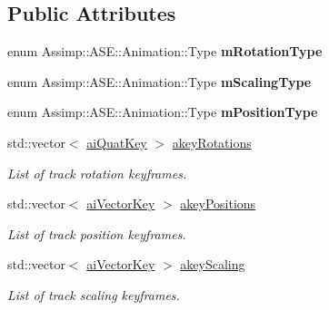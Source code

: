 \subsection*{Public Attributes}
\begin{DoxyCompactItemize}
\item 
\hypertarget{struct_assimp_1_1_a_s_e_1_1_animation_a14e7fec0c226ead3f354beba67edb8bd}{enum Assimp\+::\+A\+S\+E\+::\+Animation\+::\+Type {\bfseries m\+Rotation\+Type}}\label{struct_assimp_1_1_a_s_e_1_1_animation_a14e7fec0c226ead3f354beba67edb8bd}

\item 
\hypertarget{struct_assimp_1_1_a_s_e_1_1_animation_add6328c378c006898aaf97eebc273603}{enum Assimp\+::\+A\+S\+E\+::\+Animation\+::\+Type {\bfseries m\+Scaling\+Type}}\label{struct_assimp_1_1_a_s_e_1_1_animation_add6328c378c006898aaf97eebc273603}

\item 
\hypertarget{struct_assimp_1_1_a_s_e_1_1_animation_ac69ea1d645e459548e26c4b2751e4968}{enum Assimp\+::\+A\+S\+E\+::\+Animation\+::\+Type {\bfseries m\+Position\+Type}}\label{struct_assimp_1_1_a_s_e_1_1_animation_ac69ea1d645e459548e26c4b2751e4968}

\item 
\hypertarget{struct_assimp_1_1_a_s_e_1_1_animation_aef0da0cce83a77e738d67bc913d69a37}{std\+::vector$<$ \hyperlink{structai_quat_key}{ai\+Quat\+Key} $>$ \hyperlink{struct_assimp_1_1_a_s_e_1_1_animation_aef0da0cce83a77e738d67bc913d69a37}{akey\+Rotations}}\label{struct_assimp_1_1_a_s_e_1_1_animation_aef0da0cce83a77e738d67bc913d69a37}

\begin{DoxyCompactList}\small\item\em List of track rotation keyframes. \end{DoxyCompactList}\item 
\hypertarget{struct_assimp_1_1_a_s_e_1_1_animation_a6277779651b4dc3d542fff5624cd53d6}{std\+::vector$<$ \hyperlink{structai_vector_key}{ai\+Vector\+Key} $>$ \hyperlink{struct_assimp_1_1_a_s_e_1_1_animation_a6277779651b4dc3d542fff5624cd53d6}{akey\+Positions}}\label{struct_assimp_1_1_a_s_e_1_1_animation_a6277779651b4dc3d542fff5624cd53d6}

\begin{DoxyCompactList}\small\item\em List of track position keyframes. \end{DoxyCompactList}\item 
\hypertarget{struct_assimp_1_1_a_s_e_1_1_animation_a6433fa20584f728e2422d422471190c0}{std\+::vector$<$ \hyperlink{structai_vector_key}{ai\+Vector\+Key} $>$ \hyperlink{struct_assimp_1_1_a_s_e_1_1_animation_a6433fa20584f728e2422d422471190c0}{akey\+Scaling}}\label{struct_assimp_1_1_a_s_e_1_1_animation_a6433fa20584f728e2422d422471190c0}

\begin{DoxyCompactList}\small\item\em List of track scaling keyframes. \end{DoxyCompactList}\end{DoxyCompactItemize}


